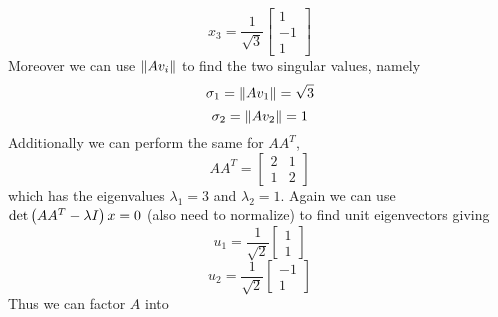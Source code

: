 \begin{enumerate}[label=\arabic*.]
\begin{mdframed}[style=MyFrame]
            \begin{equation}
                x_{3} =
                \frac{1}{\sqrt{3}}
                \begin{bmatrix}
                    1       \\
                    -1      \\
                    1
                \end{bmatrix}
            \end{equation}
            Moreover we can use $\norm{Av_{i}}$ to find the two singular
            values, namely
            \begin{equation}
                \sigma_{1} = \norm{Av_{1}} = \sqrt{3}
            \end{equation}
            \begin{equation}
                \sigma_{2} = \norm{Av_{2}} = 1
            \end{equation}
            Additionally we can perform the same for $AA^{T}$,
            \begin{equation}
                AA^{T} =
                \begin{bmatrix}
                    2       &       1       \\
                    1       &       2
                \end{bmatrix}
            \end{equation}
            which has the eigenvalues $\lambda_{1} = 3$ and $\lambda_{2} =
            1$. Again we can use $\text{det}\left(AA^{T} - \lambda I\right)x =
            0$ (also need to normalize) to find unit eigenvectors giving
            \begin{equation}
                u_{1} = 
                \frac{1}{\sqrt{2}}
                \begin{bmatrix}
                    1       \\
                    1
                \end{bmatrix}
            \end{equation}
            \begin{equation}
                u_{2} =
                \frac{1}{\sqrt{2}}
                \begin{bmatrix}
                    -1      \\
                    1
                \end{bmatrix}
            \end{equation}
            Thus we can factor $A$ into 
            \begin{equation}

\end{equation}
\end{mdframed}
\end{enumerate}
